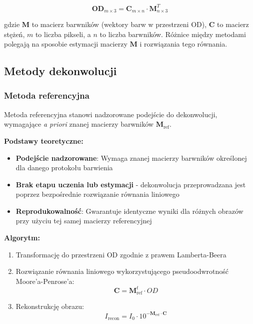 \documentclass{article}
\begin{document}
\begin{equation}
\mathbf{OD}_{m \times 3} = \mathbf{C}_{m \times n} \cdot \mathbf{M}_{n \times 3}^T
\end{equation}

gdzie $\mathbf{M}$ to macierz barwników (wektory barw w przestrzeni OD), $\mathbf{C}$ to macierz stężeń, $m$ to liczba pikseli, a $n$ to liczba barwników. Różnice między metodami polegają na sposobie estymacji macierzy $\mathbf{M}$ i rozwiązania tego równania.

\subsection{Metody dekonwolucji}

\subsubsection{Metoda referencyjna}

Metoda referencyjna stanowi nadzorowane podejście do dekonwolucji, wymagające \textit{a priori} znanej macierzy barwników $\mathbf{M}_{\text{ref}}$. 

\textbf{Podstawy teoretyczne:}
\begin{itemize}
    \item \textbf{Podejście nadzorowane}: Wymaga znanej macierzy barwników określonej dla danego protokołu barwienia
    \item \textbf{Brak etapu uczenia lub estymacji} - dekonwolucja przeprowadzana jest poprzez bezpośrednie rozwiązanie równania liniowego
    \item \textbf{Reprodukowalność}: Gwarantuje identyczne wyniki dla różnych obrazów przy użyciu tej samej macierzy referencyjnej
\end{itemize}

\textbf{Algorytm:}
\begin{enumerate}
    \item Transformację do przestrzeni OD zgodnie z prawem Lamberta-Beera
    \item Rozwiązanie równania liniowego wykorzystującego pseudoodwrotność Moore'a-Penrose'a:
    \begin{equation}
        \mathbf{C} = \mathbf{M}_{\text{ref}}^{t} \cdot OD
    \end{equation}
    \item Rekonstrukcję obrazu:
    \begin{equation}
        I_{\text{recon}} = I_0 \cdot 10^{-\mathbf{M}_{\text{ref}} \cdot \mathbf{C}}
    \end{equation}
\end{enumerate}
\end{document}
